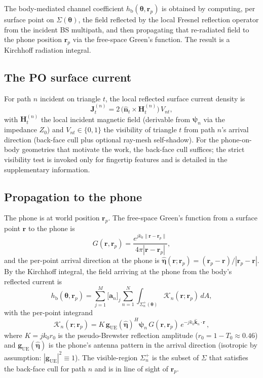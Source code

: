 \documentclass[journal,twocolumn,10pt]{IEEEtran}
\theoremstyle{plain}
\theoremstyle{definition}
\theoremstyle{remark}
\newcommand{\nhat}{\hat{\bm{n}}}
\newcommand{\etahat}{\hat{\bm{\eta}}}
\newcommand{\rr}{\mathbf{r}}
\newcommand{\HH}{\mathbf{H}}
\newcommand{\psin}{\bm{\psi}_n}
\newcommand{\thetab}{\bm{\theta}}
\newcommand{\hbody}{h_{\mathrm{b}}}
\newcommand{\Tepskin}{T_{0}}
\begin{document}

The body-mediated channel coefficient $\hbody(\thetab,\rr_p)$ is
obtained by computing, per surface point on $\Sigma(\thetab)$, the
field reflected by the local Fresnel reflection operator from the
incident BS multipath, and then propagating that re-radiated field
to the phone position $\rr_p$ via the free-space Green's function.
The result is a Kirchhoff radiation integral.

\subsection{The PO surface current}

For path $n$ incident on triangle $t$, the local reflected surface
current density is
\begin{equation}\label{eq:Js}
\bm{J}^{(n)}_t = 2\,\bigl(\nhat_t \times \HH^{(n)}_t\bigr)\,V_{nt},
\end{equation}
with $\HH^{(n)}_t$ the local incident magnetic field (derivable
from $\psin$ via the impedance $Z_0$) and $V_{nt} \in \{0,1\}$ the
visibility of triangle $t$ from path $n$'s arrival direction
(back-face cull plus optional ray-mesh self-shadow). For the
phone-on-body geometries that motivate the work, the back-face cull
suffices; the strict visibility test is invoked only for fingertip
features and is detailed in the supplementary information.

\subsection{Propagation to the phone}

The phone is at world position $\rr_p$. The free-space Green's
function from a surface point $\rr$ to the phone is
\begin{equation}
G(\rr,\rr_p) = \frac{e^{jk_0 \|\rr-\rr_p\|}}{4\pi|\rr-\rr_p|},
\end{equation}
and the per-point arrival direction at the phone is $\etahat(\rr;\rr_p)
= (\rr_p - \rr) / |\rr_p - \rr|$. By the Kirchhoff integral, the
field arriving at the phone from the body's reflected current is
\begin{equation}\label{eq:kirchhoff-integral}
\hbody(\thetab,\rr_p) = \sum_{j=1}^{M} \bigl[\bm{a}_n\bigr]_j
\sum_{n=1}^{N} \int_{\Sigma_n^{+}(\thetab)} \mathcal{K}_n(\rr;\rr_p)\,dA,
\end{equation}
with the per-point integrand
\begin{equation}\label{eq:kernel}
\mathcal{K}_n(\rr;\rr_p) = K\,\bm{g}_{\mathrm{UE}}(\etahat)^{H}\psin
\,G(\rr,\rr_p)\,e^{-jk_0\hat{\bm{k}}_n\cdot\rr} \,,
\end{equation}
where $K = jk_0 r_0$ is the pseudo-Brewster reflection amplitude
($r_0 = 1 - \Tepskin \approx 0.46$) and
$\bm{g}_{\mathrm{UE}}(\etahat)$ is the phone's antenna pattern in
the arrival direction (isotropic by assumption: $|\bm{g}_{\mathrm{UE}}|^2
\equiv 1$). The visible-region $\Sigma_n^{+}$ is the subset of
$\Sigma$ that satisfies the back-face cull for path $n$ and is in
line of sight of $\rr_p$.
\end{document}
